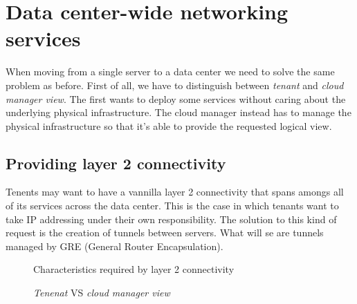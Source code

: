 \section{Data center-wide networking services}
When moving from a single server to a data center we need to solve the same
problem as before. First of all, we have to distinguish between \emph{tenant}
and \emph{cloud manager view}. The first wants to deploy some services without
caring about the underlying physical infrastructure. The cloud manager instead
has to manage the physical infrastructure so that it's able to provide the
requested logical view.

\subsection{Providing layer 2 connectivity}
Tenents may want to have a vannilla layer 2 connectivity that spans amongs all of
its services across the data center. This is the case in which tenants want to
take IP addressing under their own responsibility. The solution to this kind of
request is the creation of tunnels between servers. What will se are tunnels
managed by GRE (General Router Encapsulation).

\newpage
\begin{figure}[ht!]
    \centering
    \caption{Characteristics required by layer 2 connectivity}
\end{figure}

\begin{figure}[h!]
    \centering
    \hspace{1.5cm}
    \caption{\emph{Tenenat} VS \emph{cloud manager view}}
\end{figure}

